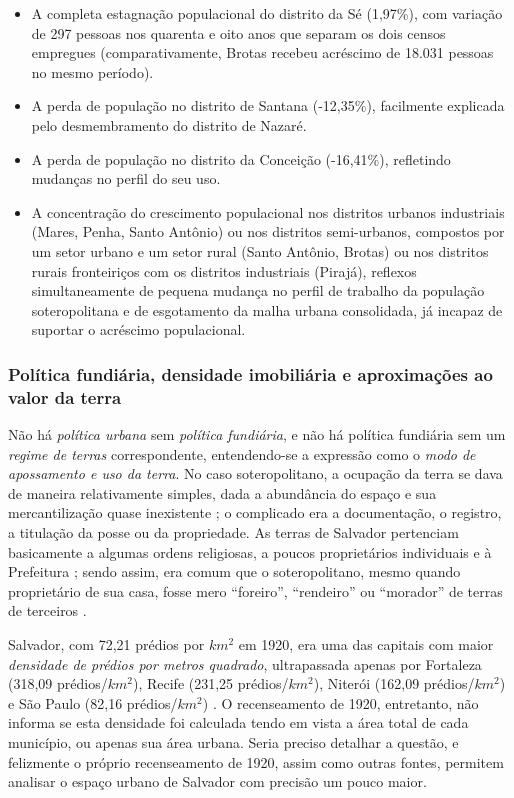 \begin{itemize}
\item A completa estagnação populacional do distrito da Sé (1,97\%), com variação de 297 pessoas nos quarenta e oito anos que separam os dois censos empregues (comparativamente, Brotas recebeu acréscimo de 18.031 pessoas no mesmo período).
\item A perda de população no distrito de Santana (-12,35\%), facilmente explicada pelo desmembramento do distrito de Nazaré.
\item A perda de população no distrito da Conceição (-16,41\%), refletindo mudanças no perfil do seu uso.
\item A concentração do crescimento populacional nos distritos urbanos industriais (Mares, Penha, Santo Antônio) ou nos distritos semi-urbanos, compostos por um setor urbano e um setor rural (Santo Antônio, Brotas) ou nos distritos rurais fronteiriços com os distritos industriais (Pirajá), reflexos simultaneamente de pequena mudança no perfil de trabalho da população soteropolitana e de esgotamento da malha urbana consolidada, já incapaz de suportar o acréscimo populacional.
\end{itemize}

\subsubsection{Política fundiária, densidade imobiliária e aproximações ao valor da terra}\label{subsubsec:polfundvalter}

Não há \textit{política urbana} sem \textit{política fundiária}, e não há política fundiária sem um \textit{regime de terras} correspondente, entendendo-se a expressão como o \textit{modo de apossamento e uso da terra}. No caso soteropolitano, a ocupação da terra se dava de maneira relativamente simples, dada a abundância do espaço e sua mercantilização quase inexistente \cite[p.~25]{MOURA1990}; o complicado era a documentação, o registro, a titulação da posse ou da propriedade. As terras de Salvador pertenciam basicamente a algumas ordens religiosas, a poucos proprietários individuais e à Prefeitura \cite{CEDURB1978}; sendo assim, era comum que o soteropolitano, mesmo quando proprietário de sua casa, fosse mero ``foreiro'', ``rendeiro'' ou ``morador'' de terras de terceiros \cite[p.~139]{BRANDAO1980}. 

Salvador, com 72,21 prédios por $km^{2}$ em 1920, era uma das capitais com maior \textit{densidade de prédios por metros quadrado}, ultrapassada apenas por Fortaleza (318,09 prédios/$km^{2}$), Recife (231,25 prédios/$km^{2}$), Niterói (162,09 prédios/$km^{2}$) e São Paulo (82,16 prédios/$km^{2}$) \cite[p.~XV]{brasil_censo46_1920}. O recenseamento de 1920, entretanto, não informa se esta densidade foi calculada tendo em vista a área total de cada município, ou apenas sua área urbana. Seria preciso detalhar a questão, e felizmente o próprio recenseamento de 1920, assim como outras fontes, permitem analisar o espaço urbano de Salvador com precisão um pouco maior.

